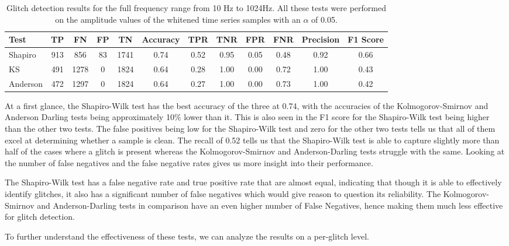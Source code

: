 \documentclass[12pt]{article}
\begin{document}
\begin{table}[H]
  \centering
  \begin{tabular}{lccccccccccc}
  \toprule
  Test & TP & FN & FP & TN & Accuracy & TPR & TNR & FPR & FNR & Precision & F1 Score \\
  \midrule
  Shapiro & 913 & 856 & 83 & 1741 & 0.74 & 0.52 & 0.95 & 0.05 & 0.48 & 0.92 & 0.66 \\
  KS & 491 & 1278 & 0 & 1824 & 0.64 & 0.28 & 1.00 & 0.00 & 0.72 & 1.00 & 0.43 \\
  Anderson & 472 & 1297 & 0 & 1824 & 0.64 & 0.27 & 1.00 & 0.00 & 0.73 & 1.00 & 0.42 \\
  \bottomrule
  \end{tabular}
  \caption{Glitch detection results for the full frequency range from 10 Hz to 1024Hz. All these tests were performed on the amplitude values of the whitened time series samples with an $\alpha$ of 0.05.}
  \label{tab:full_range_results}
\end{table}

\noindent At a first glance, the Shapiro-Wilk test has the best accuracy of the three at 0.74, with the accuracies of the Kolmogorov-Smirnov and Anderson Darling tests being approximately 10\% lower than it. This is also seen in the F1 score for the Shapiro-Wilk test being higher than the other two tests. The false positives being low for the Shapiro-Wilk test and zero for the other two tests tells us that all of them excel at determining whether a sample is clean. The recall of 0.52 tells us that the Shapiro-Wilk test is able to capture slightly more than half of the cases where a glitch is present whereas the Kolmogorov-Smirnov and Anderson-Darling tests struggle with the same. Looking at the number of false negatives and the false negative rates gives us more insight into their performance.

\medskip
\noindent The Shapiro-Wilk test has a false negative rate and true positive rate that are almost equal, indicating that though it is able to effectively identify glitches, it also has a significant number of false negatives which would give reason to question its reliability. The Kolmogorov-Smirnov and Anderson-Darling tests in comparison have an even higher number of False Negatives, hence making them much less effective for glitch detection.

\medskip
\noindent To further understand the effectiveness of these tests, we can analyze the results on a per-glitch level.
\end{document}
